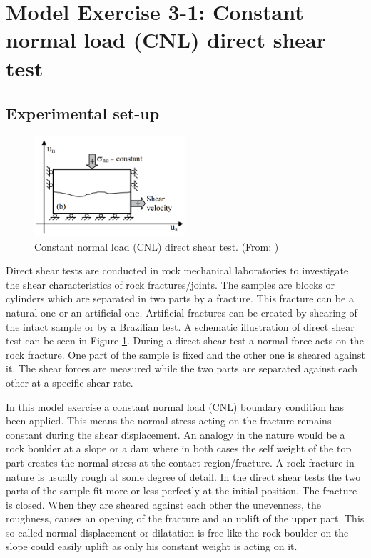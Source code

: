 \section{Model Exercise 3-1: Constant normal load (CNL) direct shear test}
\label{sec:mex07}
\subsection{Experimental set-up}
\begin{figure}[!ht]
\begin{center}
\includegraphics[width=0.5\textwidth]{./figures/MEX7_CNL_Nguyen_Thesis.PNG}
\end{center}
\caption{Constant normal load (CNL) direct shear test. (From: \cite{Nguyen2014})}
\label{fig:MEX7_CNL}
\end{figure}
Direct shear tests are conducted in rock mechanical laboratories to investigate the shear characteristics of rock fractures/joints. The samples are blocks or cylin\-ders which are separated in two parts by a fracture. This fracture can be a natural one or an artificial one. Artificial fractures can be created by shearing of the intact sample or by a Brazilian test.
%
A schematic illustration of direct shear test can be seen in Figure \ref{fig:MEX7_CNL}. During a direct shear test a normal force acts on the rock fracture. One part of the sample is fixed and the other one is sheared against it. The shear forces are measured while the two parts are separated against each other at a specific shear rate.

In this model exercise a constant normal load (CNL) boundary condition has been applied. This means the normal stress acting on the fracture remains constant during the shear displacement. An analogy in the nature would be a rock boulder at a slope or a dam where in both cases the self weight of the top part creates the normal stress at the contact region/fracture.
%
A rock fracture in nature is usually rough at some degree of detail. In the direct shear tests the two parts of the sample fit more or less perfectly at the initial position. The fracture is closed. When they are sheared against each other the unevenness, the roughness, causes an opening of the fracture and an uplift of the upper part. This so called normal displacement or dilatation is free like the rock boulder on the slope could easily uplift as only his constant weight is acting on it.

